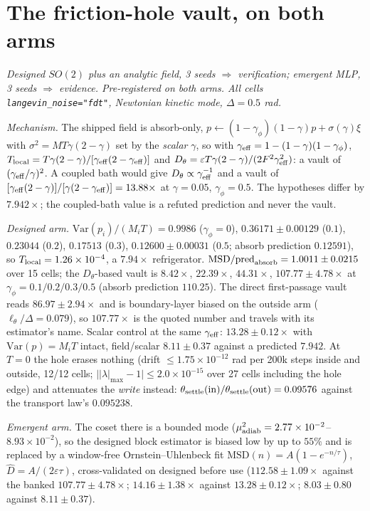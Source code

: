 \section{The friction-hole vault, on both arms}\label{app:vault}

\emph{Designed $SO(2)$ plus an analytic field, 3 seeds $\Rightarrow$ verification; emergent MLP, 3 seeds $\Rightarrow$ evidence. Pre-registered on both arms. All cells \texttt{langevin\_noise="fdt"}, Newtonian kinetic mode, $\Delta=0.5$ rad.}

\emph{Mechanism.} The shipped field is absorb-only, $p\leftarrow(1-\gamma_\phi)(1-\gamma)p+\sigma(\gamma)\xi$ with $\sigma^2=MT\gamma(2-\gamma)$ set by the \emph{scalar} $\gamma$, so with $\gamma_{\rm eff}=1-(1-\gamma)(1-\gamma_\phi)$, $T_{\rm local}=T\gamma(2-\gamma)/[\gamma_{\rm eff}(2-\gamma_{\rm eff})]$ and $D_\theta=\varepsilon T\gamma(2-\gamma)/(2F^2\gamma_{\rm eff}^2)$: a vault of $(\gamma_{\rm eff}/\gamma)^2$. A coupled bath would give $D_\theta\propto\gamma_{\rm eff}^{-1}$ and a vault of $[\gamma_{\rm eff}(2-\gamma)]/[\gamma(2-\gamma_{\rm eff})]=13.88\times$ at $\gamma=0.05$, $\gamma_\phi=0.5$. The hypotheses differ by $7.942\times$; the coupled-bath value is a refuted prediction and never the vault.

\emph{Designed arm.} $\mathrm{Var}(p_i)/(M_iT)=0.9986$ ($\gamma_\phi=0$), $0.36171\pm0.00129$ ($0.1$), $0.23044$ ($0.2$), $0.17513$ ($0.3$), $0.12600\pm0.00031$ ($0.5$; absorb prediction $0.12591$), so $T_{\rm local}=1.26\times10^{-4}$, a $7.94\times$ refrigerator. $\mathrm{MSD}/\text{pred}_{\rm absorb}=1.0011\pm0.0215$ over 15 cells; the $D_\theta$-based vault is $8.42\times$, $22.39\times$, $44.31\times$, $107.77\pm4.78\times$ at $\gamma_\phi=0.1/0.2/0.3/0.5$ (absorb prediction $110.25$). The direct first-passage vault reads $86.97\pm2.94\times$ and is boundary-layer biased on the outside arm ($\ell_\theta/\Delta=0.079$), so $107.77\times$ is the quoted number and travels with its estimator's name. Scalar control at the same $\gamma_{\rm eff}$: $13.28\pm0.12\times$ with $\mathrm{Var}(p)=M_iT$ intact, field/scalar $8.11\pm0.37$ against a predicted $7.942$. At $T=0$ the hole erases nothing (drift $\le1.75\times10^{-12}$ rad per 200k steps inside and outside, 12/12 cells; $\big||\lambda|_{\max}-1\big|\le2.0\times10^{-15}$ over 27 cells including the hole edge) and attenuates the \emph{write} instead: $\theta_{\rm settle}({\rm in})/\theta_{\rm settle}({\rm out})=0.09576$ against the transport law's $0.095238$.

\emph{Emergent arm.} The coset there is a bounded mode ($\mu^2_{\rm adiab}=2.77\times10^{-2}$--$8.93\times10^{-2}$), so the designed block estimator is biased low by up to $55\%$ and is replaced by a window-free Ornstein--Uhlenbeck fit $\mathrm{MSD}(n)=A(1-e^{-n/\tau})$, $\hat D=A/(2\varepsilon\tau)$, cross-validated on designed before use ($112.58\pm1.09\times$ against the banked $107.77\pm4.78\times$; $14.16\pm1.38\times$ against $13.28\pm0.12\times$; $8.03\pm0.80$ against $8.11\pm0.37$).

